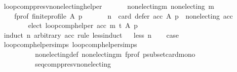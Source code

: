 \begin{isabellebody}
%
\endisadelimproof
\isanewline
{}\isamarkupfalse%
\ loop{\isacharunderscore}{\kern0pt}comp{\isacharunderscore}{\kern0pt}presv{\isacharunderscore}{\kern0pt}non{\isacharunderscore}{\kern0pt}electing{\isacharunderscore}{\kern0pt}helper{\isacharcolon}{\kern0pt}\isanewline
\ \ \isanewline
\ \ \ \ non{\isacharunderscore}{\kern0pt}electing{\isacharunderscore}{\kern0pt}m{\isacharcolon}{\kern0pt}\ {\isachardoublequoteopen}non{\isacharunderscore}{\kern0pt}electing\ m{\isachardoublequoteclose}\ \isanewline
\ \ \ \ f{\isacharunderscore}{\kern0pt}prof{\isacharcolon}{\kern0pt}\ {\isachardoublequoteopen}finite{\isacharunderscore}{\kern0pt}profile\ A\ p{\isachardoublequoteclose}\isanewline
\ \ \isanewline
\ \ \ \ {\isachardoublequoteopen}{\isacharparenleft}{\kern0pt}n\ {\isacharequal}{\kern0pt}\ card\ {\isacharparenleft}{\kern0pt}defer\ acc\ A\ p{\isacharparenright}{\kern0pt}\ {\isasymand}\ non{\isacharunderscore}{\kern0pt}electing\ acc{\isacharparenright}{\kern0pt}\ {\isasymLongrightarrow}\isanewline
\ \ \ \ \ \ \ \ elect\ {\isacharparenleft}{\kern0pt}loop{\isacharunderscore}{\kern0pt}comp{\isacharunderscore}{\kern0pt}helper\ acc\ m\ t{\isacharparenright}{\kern0pt}\ A\ p\ {\isacharequal}{\kern0pt}\ {\isacharbraceleft}{\kern0pt}{\isacharbraceright}{\kern0pt}{\isachardoublequoteclose}\isanewline
%
\isadelimproof
%
\endisadelimproof
%
\isatagproof
{}\isamarkupfalse%
\ {\isacharparenleft}{\kern0pt}induct\ n\ arbitrary{\isacharcolon}{\kern0pt}\ acc\ rule{\isacharcolon}{\kern0pt}\ less{\isacharunderscore}{\kern0pt}induct{\isacharparenright}{\kern0pt}\isanewline
\ \ \isamarkupfalse%
{\isacharparenleft}{\kern0pt}less\ n{\isacharparenright}{\kern0pt}\isanewline
\ \ \isamarkupfalse%
\ {\isacharquery}{\kern0pt}case\isanewline
\ \ \ \ \isamarkupfalse%
\ loop{\isacharunderscore}{\kern0pt}comp{\isacharunderscore}{\kern0pt}helper{\isachardot}{\kern0pt}simps{\isacharparenleft}{\kern0pt}{}{\isacharparenright}{\kern0pt}\ loop{\isacharunderscore}{\kern0pt}comp{\isacharunderscore}{\kern0pt}helper{\isachardot}{\kern0pt}simps{\isacharparenleft}{\kern0pt}{}{\isacharparenright}{\kern0pt}\isanewline
\ \ \ \ \ \ \ \ \ \ non{\isacharunderscore}{\kern0pt}electing{\isacharunderscore}{\kern0pt}def\ non{\isacharunderscore}{\kern0pt}electing{\isacharunderscore}{\kern0pt}m\ f{\isacharunderscore}{\kern0pt}prof\ psubset{\isacharunderscore}{\kern0pt}card{\isacharunderscore}{\kern0pt}mono\isanewline
\ \ \ \ \ \ \ \ \ \ seq{\isacharunderscore}{\kern0pt}comp{\isacharunderscore}{\kern0pt}presv{\isacharunderscore}{\kern0pt}non{\isacharunderscore}{\kern0pt}electing\isanewline

\end{isabellebody}
